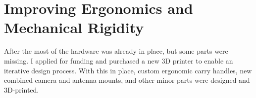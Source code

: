 \chapter{Improving Ergonomics and Mechanical Rigidity}
\label{chap:hardware}

After the \preproject most of the hardware was already in place, but some parts were missing.
I applied for funding and purchased a new 3D printer to enable an iterative design process.
With this in place, custom ergonomic carry handles, new combined camera and antenna mounts, and other minor parts were designed and 3D-printed.